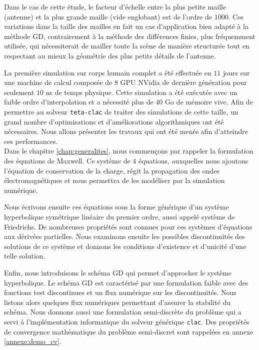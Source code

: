 Dans le cas de cette étude, le facteur d'échelle entre la plus petite
maille (antenne) et la plus grande maille (vide englobant) est de l'ordre
de $1000$. Ces variations dans la taille des mailles en fait un cas
d'application bien adapté à la méthode GD, contrairement à la 
méthode des différences finies, plus fréquemment utilisée, qui nécessiterait
de mailler toute la scène de manière structurée tout en respectant
au mieux la géométrie des plus petits détails de l'antenne.

La première simulation sur corps humain complet a été effectuée en $11$ jours
sur une machine de calcul composée de $8$ GPU NVidia de dernière génération
pour seulement $10$ ns de temps physique.
Cette simulation a été exécutée avec un faible ordre d'interpolation
et a nécessité plus de $40$ Go de mémoire vive.
Afin de permettre au solveur \texttt{teta-clac} de traiter des simulations
de cette taille, un grand nombre d'optimisations et
d'améliorations algorithmiques ont été nécessaires.
Nous allons présenter les travaux qui ont été menés afin d'atteindre
ces performances.
\\



Dans le chapitre \ref{chap:generalites}, nous commençons
par rappeler la formulation des équations de Maxwell.
Ce système de $4$ équations, auxquelles nous ajoutons
l'équation de conservation de la charge, régit
la propagation des ondes électromagnétiques et nous permettra
de les modéliser par la simulation numérique.

Nous écrivons ensuite ces équations sous la forme générique d'un
système hyperbolique symétrique linéaire du premier ordre,
aussi appelé système de Friedrichs. De nombreuses propriétés
sont connues pour ces systèmes d'équations aux dérivées partielles. Nous examinons
ensuite les possibles discontinuités des solutions de ce système
et donnons les conditions d'existence et d'unicité d'une
telle solution.

Enfin, nous introduisons le schéma GD
qui permet d'approcher le système hyperbolique. Le schéma GD est caractérisé par une formulation faible avec
des fonctions test discontinues et un flux numérique sur les discontinuités.
Nous listons alors quelques flux numériques permettant
d'assurer la stabilité du schéma.
Nous donnons aussi une formulation semi-discrète du problème
qui a servi à l'implémentation informatique du solveur
 générique \texttt{clac}.
Des propriétés de convergence mathématique du problème semi-discret
sont rappelées en annexe \ref{annexe:demo_cv}.
\\



